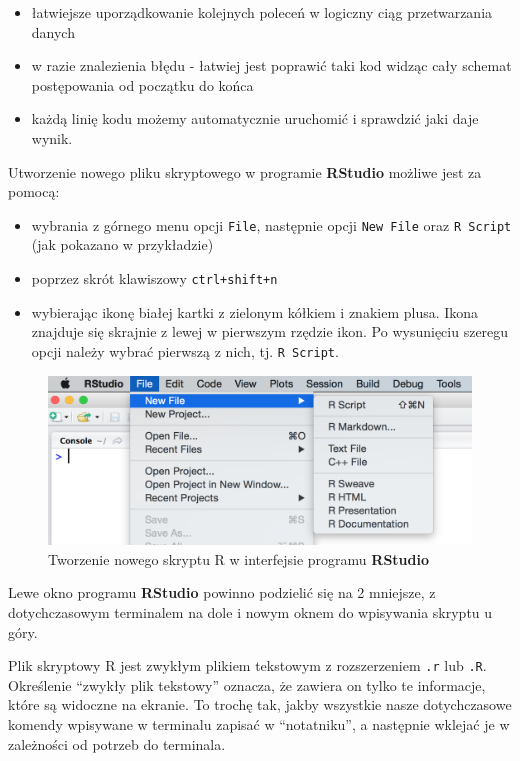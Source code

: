 \documentclass[]{book}
\providecommand{\tightlist}{%
  \setlength{\itemsep}{0pt}\setlength{\parskip}{0pt}}
\theoremstyle{definition}
\theoremstyle{definition}
\theoremstyle{definition}
\theoremstyle{remark}
\begin{document}
\begin{itemize}
\tightlist
\item
  łatwiejsze uporządkowanie kolejnych poleceń w logiczny ciąg
  przetwarzania danych
\item
  w razie znalezienia błędu - łatwiej jest poprawić taki kod widząc cały
  schemat postępowania od początku do końca
\item
  każdą linię kodu możemy automatycznie uruchomić i sprawdzić jaki daje
  wynik.
\end{itemize}

Utworzenie nowego pliku skryptowego w programie \textbf{RStudio} możliwe
jest za pomocą:

\begin{itemize}
\tightlist
\item
  wybrania z górnego menu opcji \texttt{File}, następnie opcji
  \texttt{New\ File} oraz \texttt{R\ Script} (jak pokazano w
  przykładzie)
\item
  poprzez skrót klawiszowy \texttt{ctrl+shift+n}
\item
  wybierając ikonę białej kartki z zielonym kółkiem i znakiem plusa.
  Ikona znajduje się skrajnie z lewej w pierwszym rzędzie ikon. Po
  wysunięciu szeregu opcji należy wybrać pierwszą z nich, tj.
  \texttt{R\ Script}.
\end{itemize}

\begin{figure}
\centering
\includegraphics{figures/rstudio_newfile.png}
\caption{Tworzenie nowego skryptu R w interfejsie programu
\textbf{RStudio}}
\end{figure}

Lewe okno programu \textbf{RStudio} powinno podzielić się na 2 mniejsze,
z dotychczasowym terminalem na dole i nowym oknem do wpisywania skryptu
u góry.

Plik skryptowy R jest zwykłym plikiem tekstowym z rozszerzeniem
\texttt{.r} lub \texttt{.R}. Określenie ``zwykły plik tekstowy''
oznacza, że zawiera on tylko te informacje, które są widoczne na
ekranie. To trochę tak, jakby wszystkie nasze dotychczasowe komendy
wpisywane w terminalu zapisać w ``notatniku'', a następnie wklejać je w
zależności od potrzeb do terminala.
\end{document}
